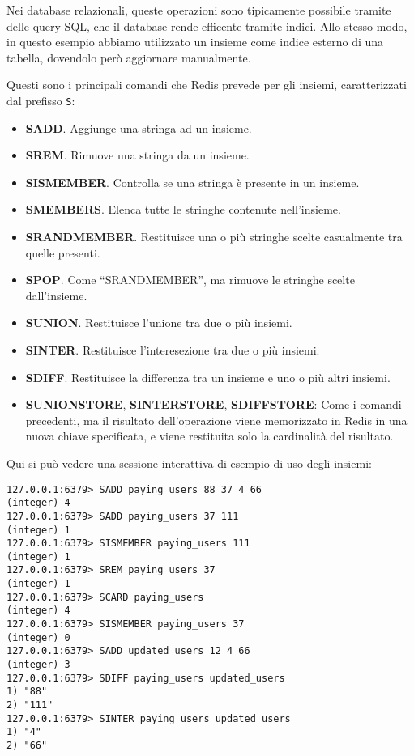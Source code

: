 Nei database relazionali, queste operazioni sono tipicamente possibile tramite delle query SQL, che
il database rende efficente tramite indici. Allo stesso modo, in questo esempio abbiamo utilizzato
un insieme come indice esterno di una tabella, dovendolo però aggiornare manualmente.

Questi sono i principali comandi che Redis prevede per gli insiemi, caratterizzati dal prefisso
\verb|S|:

\begin{itemize}
	\medskip
	\item \textbf{SADD}. Aggiunge una stringa ad un insieme.
	\item \textbf{SREM}. Rimuove una stringa da un insieme.
	\item \textbf{SISMEMBER}. Controlla se una stringa è presente in un insieme.
	\item \textbf{SMEMBERS}. Elenca tutte le stringhe contenute nell'insieme.
	\item \textbf{SRANDMEMBER}. Restituisce una o più stringhe scelte casualmente tra quelle
	presenti.
	\item \textbf{SPOP}. Come ``SRANDMEMBER'', ma rimuove le stringhe scelte dall'insieme.
	\item \textbf{SUNION}. Restituisce l'unione tra due o più insiemi.
	\item \textbf{SINTER}. Restituisce l'interesezione tra due o più insiemi.
	\item \textbf{SDIFF}. Restituisce la differenza tra un insieme e uno o più altri insiemi.
	\item \textbf{SUNIONSTORE}, \textbf{SINTERSTORE}, \textbf{SDIFFSTORE}: Come i comandi
	precedenti, ma il risultato dell'operazione viene memorizzato in Redis in una nuova chiave
	specificata, e viene restituita solo la cardinalità del risultato.
\end{itemize}

Qui si può vedere una sessione interattiva di esempio di uso degli insiemi:

\medskip
\begin{lstlisting}
127.0.0.1:6379> SADD paying_users 88 37 4 66
(integer) 4
127.0.0.1:6379> SADD paying_users 37 111
(integer) 1
127.0.0.1:6379> SISMEMBER paying_users 111
(integer) 1
127.0.0.1:6379> SREM paying_users 37
(integer) 1
127.0.0.1:6379> SCARD paying_users
(integer) 4
127.0.0.1:6379> SISMEMBER paying_users 37
(integer) 0
127.0.0.1:6379> SADD updated_users 12 4 66
(integer) 3
127.0.0.1:6379> SDIFF paying_users updated_users
1) "88"
2) "111"
127.0.0.1:6379> SINTER paying_users updated_users
1) "4"
2) "66"
\end{lstlisting}

